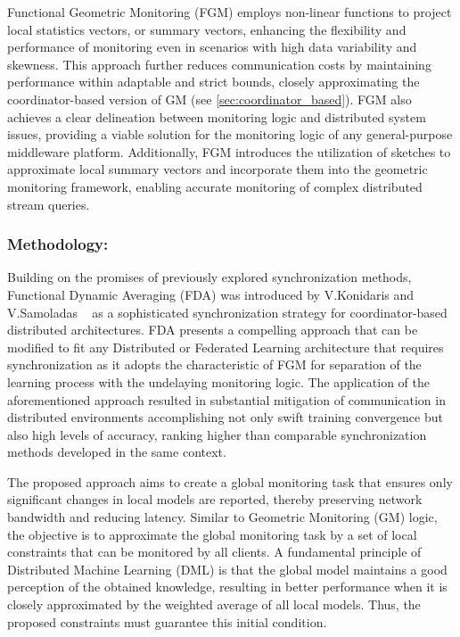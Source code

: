Functional Geometric Monitoring (FGM) employs non-linear functions to project local statistics vectors, or summary vectors, enhancing the flexibility and
performance of monitoring even in scenarios with high data variability and skewness. This approach further reduces communication costs by maintaining
performance within adaptable and strict bounds, closely approximating the coordinator-based version of GM (see \cref{sec:coordinator_based}). FGM also achieves a clear
delineation between monitoring logic and distributed system issues, providing a viable solution for the monitoring logic of any general-purpose middleware
platform. Additionally, FGM introduces the utilization of sketches to approximate local summary vectors and incorporate them into the geometric monitoring
framework, enabling accurate monitoring of complex distributed stream queries.

\subsubsection{Methodology:}
\label{sec:methodology}
Building on the promises of previously explored synchronization methods, Functional Dynamic Averaging (FDA) was introduced by V.Konidaris and V.Samoladas
~\cite{konidarisvissarionExtremeScaleOnlineMachine2022} as a sophisticated synchronization strategy for coordinator-based distributed architectures.
FDA presents a compelling approach that can be modified to fit any Distributed or Federated Learning architecture that requires synchronization
as it adopts the characteristic of FGM for separation of the learning process with the undelaying monitoring logic. The application of the
aforementioned approach resulted in substantial mitigation of communication in distributed environments accomplishing not only swift training convergence
but also high levels of accuracy, ranking higher than comparable synchronization methods developed in the same context.

The proposed approach aims to create a global monitoring task that ensures only significant changes in local models are reported,
thereby preserving network bandwidth and reducing latency. Similar to Geometric Monitoring (GM) logic, the objective is to approximate
the global monitoring task by a set of local constraints that can be monitored by all clients. A fundamental principle of Distributed Machine
Learning (DML) is that the global model maintains a good perception of the obtained knowledge, resulting in better performance when it is
closely approximated by the weighted average of all local models. Thus, the proposed constraints must guarantee this initial condition.

